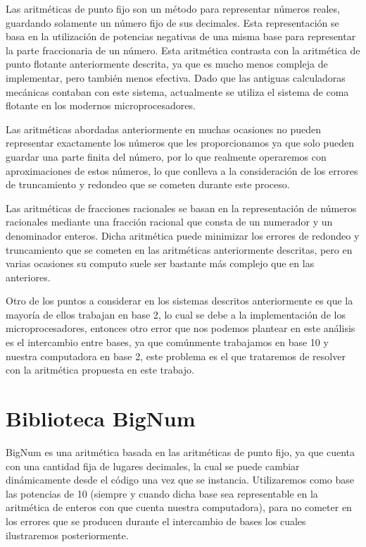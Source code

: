 \documentclass[a4paper,10pt,twocolumn]{article}
\begin{document}
Las aritméticas de punto fijo son un método para representar números reales, guardando solamente un número fijo de sus decimales. Esta representación se basa en la utilización de potencias negativas de una misma base para representar la parte fraccionaria de un número. Esta aritmética contrasta con la aritmética de punto flotante anteriormente descrita, ya que es mucho menos compleja de implementar, pero también menos efectiva. Dado que las antiguas calculadoras mecánicas contaban con este sistema, actualmente se utiliza el sistema de coma flotante en los modernos microprocesadores.

Las aritméticas abordadas anteriormente en muchas ocasiones no pueden representar exactamente los números que les proporcionamos ya que solo pueden guardar una parte finita del número, por lo que realmente operaremos con aproximaciones de estos números, lo que conlleva a la consideración de los errores de truncamiento y redondeo que se cometen durante este proceso.

Las aritméticas de fracciones racionales se basan en la representación de números racionales mediante una fracción racional que consta de un numerador y un denominador enteros. Dicha aritmética puede minimizar los errores de redondeo y truncamiento que se cometen en las aritméticas anteriormente descritas, pero en varias ocasiones su computo suele ser bastante más complejo que en las anteriores.

Otro de los puntos a considerar en los sistemas descritos anteriormente es que la mayoría de ellos trabajan en base 2, lo cual se debe a la implementación de los microprocesadores, entonces otro error que nos podemos plantear en este análisis es el intercambio entre bases, ya que comúnmente trabajamos en base 10 y nuestra computadora en base 2, este problema es el que trataremos de resolver con la aritmética propuesta en este trabajo.






\section{Biblioteca BigNum}\label{sec:big_num}
BigNum es una aritmética basada en las aritméticas de punto fijo, ya que cuenta con una cantidad fija de lugares decimales, la cual se puede cambiar dinámicamente desde el código una vez que se instancia. Utilizaremos como base las potencias de 10 (siempre y cuando dicha base sea representable en la aritmética de enteros con que cuenta nuestra computadora), para no cometer en los errores que se producen durante el intercambio de bases los cuales ilustraremos posteriormente.
\end{document}
